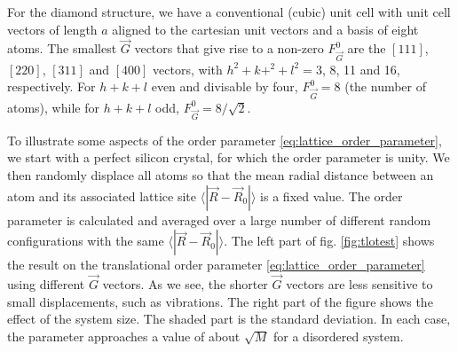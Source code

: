 \documentclass[11pt,bibliography=totoc,index=totoc]{scrbook}   %
\begin{document}
For the diamond structure, we have a conventional (cubic) unit cell with unit cell vectors of length $a$ aligned to the cartesian unit vectors 
and a basis of eight atoms.
The smallest $\vec{G}$ vectors that give rise to a non-zero $F_{\vec{G}}^0$ are the $[111]$, $[220]$, $[311]$ and $[400]$ vectors, with 
$h^2+k+^2+l^2=3$, 8, 11 and 16, respectively. 
For $h+k+l$ even and divisable by four, $F_{\vec{G}}^0 = 8$ (the number of atoms), while for $h+k+l$ odd, $F_{\vec{G}}^0=8/\sqrt{2}$.



To illustrate some aspects of the order parameter \ref{eq:lattice_order_parameter}, we start with a perfect silicon crystal, 
for which the order parameter is unity. 
We then randomly displace all atoms so that the mean radial distance between an atom and its associated lattice site $\langle |\vec{R}-\vec{R}_0|\rangle$ is a fixed value. 
The order parameter is calculated and averaged over a large number of different random configurations with the same $\langle |\vec{R}-\vec{R}_0|\rangle$.
The left part of fig. \ref{fig:tlotest} shows the result on the translational order parameter \eqref{eq:lattice_order_parameter} using different $\vec{G}$ vectors.
As we see, the shorter $\vec{G}$ vectors are less sensitive to small displacements, such as vibrations.
The right part of the figure shows the effect of the system size. The shaded part is the standard deviation.
In each case, the parameter approaches a value of about $\sqrt{M}$ for a disordered system.
\end{document}
